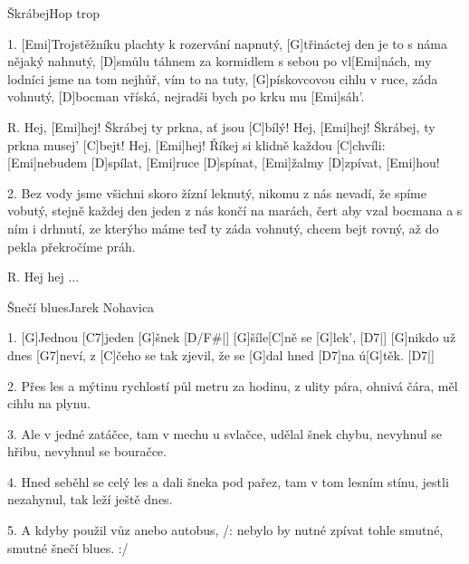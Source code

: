 \begin{song}{Škrábej}{Hop trop}

\begin{xverse}{1. }
[Emi]Trojstěžníku plachty k rozervání napnutý,
[G]třináctej den je to s náma nějaký nahnutý,
[D]smůlu táhnem za kormidlem s sebou po vl[Emi]nách,
my lodníci jsme na tom nejhůř, vím to na tuty,
[G]pískovcovou cihlu v ruce, záda vohnutý,
[D]bocman vříská, nejradši bych po krku mu [Emi]sáh'.
\end{xverse}


\begin{xverse}{R. }
Hej, [Emi]hej! Škrábej ty prkna, ať jsou [C]bílý!
Hej, [Emi]hej! Škrábej, ty prkna musej' [C]bejt!
Hej, [Emi]hej! Říkej si klidně každou [C]chvíli:
[Emi]nebudem [D]spílat, [Emi]ruce [D]spínat, [Emi]{}žalmy [D]zpívat, [Emi]hou!
\end{xverse}


\begin{xverse}{2. }
Bez vody jsme všichni skoro žízní leknutý,
nikomu z nás nevadí, že spíme vobutý,
stejně každej den jeden z nás končí na marách,
čert aby vzal bocmana a s ním i drhnutí,
ze kterýho máme teď ty záda vohnutý,
chcem bejt rovný, až do pekla překročíme práh.
\end{xverse}


\begin{xverse}{R. }
Hej hej ...
\end{xverse}

\end{song}

\begin{song}{Šnečí blues}{Jarek Nohavica}

\begin{xverse}{1. }
[G]Jednou [C7]jeden [G]{šnek}  [D/F#|]{} [G]{ší}le[C]ně se [G]lek', [D7|]{}
[G]nikdo už dnes [G7]neví, z [C]{če}ho se tak zjevil,
že se [G]dal hned [D7]na  ú[G]těk. [D7|]{}
\end{xverse}


\begin{xverse}{2. }
Přes les a mýtinu rychlostí půl metru za hodinu,
z ulity pára, ohnivá čára,
měl cihlu na plynu.
\end{xverse}


\begin{xverse}{3. }
Ale v jedné zatáčce, tam v mechu u svlačce,
udělal šnek chybu, nevyhnul se hřibu,
nevyhnul se bouračce.
\end{xverse}


\begin{xverse}{4. }
Hned seběhl se celý les a dali šneka pod pařez,
tam v tom lesním stínu, jestli nezahynul,
tak leží ještě dnes.
\end{xverse}


\begin{xverse}{5. }
A kdyby použil vůz anebo autobus,
/: nebylo by nutné zpívat tohle smutné,
   smutné šnečí blues. :/
\end{xverse}

\end{song}
\chords{ \chordDFis }


